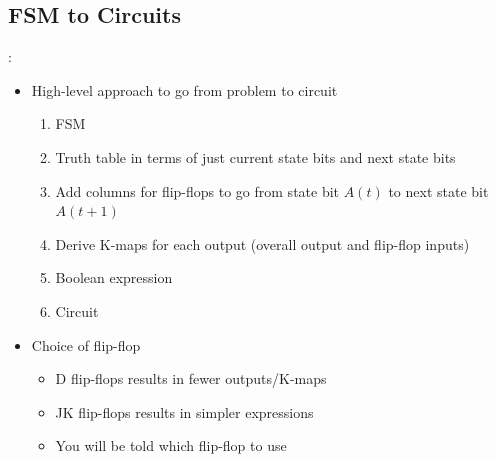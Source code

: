 \documentclass{../slides}
\begin{document}
\subsection{FSM to Circuits}
\begin{frame}{\secname: \subsecname}
    \begin{itemize}
        \item High-level approach to go from problem to circuit
        \begin{enumerate}
            \item FSM
            \item Truth table in terms of just current state bits and next state bits
            \item Add columns for flip-flops to go from state bit $A(t)$ to next state bit $A(t+1)$
            \item Derive K-maps for each output (overall output and flip-flop inputs)
            \item Boolean expression
            \item Circuit
        \end{enumerate}
        \item Choice of flip-flop
        \begin{itemize}
            \item D flip-flops results in fewer outputs/K-maps
            \item JK flip-flops results in simpler expressions
            \item You will be told which flip-flop to use
        \end{itemize}
    \end{itemize}
\end{frame}
\end{document}
